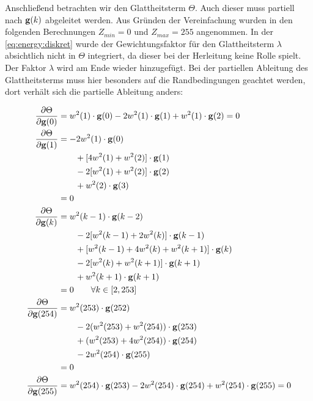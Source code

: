 Anschließend betrachten wir den Glattheitsterm $\Theta$. Auch dieser muss partiell nach $\mathbf g(k)$ abgeleitet werden. Aus Gründen der Vereinfachung wurden in den folgenden Berechnungen $Z_{min} = 0$ und $Z_{max} = 255$ angenommen. In der \autoref{eq:energy:diskret} wurde der Gewichtungsfaktor für den Glattheitsterm $\lambda$ absichtlich nicht in $\Theta$ integriert, da dieser bei der Herleitung keine Rolle spielt. Der Faktor $\lambda$ wird am Ende wieder hinzugefügt. Bei der partiellen Ableitung des Glattheitsterms muss hier besonders auf die Randbedingungen geachtet werden, dort verhält sich die partielle Ableitung anders:

\begin{align}
\label{eq:partials:smoothness:0}
\frac{\partial \Theta}{\partial \mathbf g(0)} &= w^2(1)\cdot \mathbf g(0) -2w^2(1)\cdot \mathbf g(1) + w^2(1)\cdot \mathbf g(2) = 0\\
\label{eq:partials:smoothness:1}
\frac{\partial \Theta}{\partial \mathbf g(1)} &= -2w^2(1)\cdot \mathbf g(0) \nonumber \\
        &\qquad+[4w^2(1)+w^2(2)]\cdot \mathbf g(1) \nonumber \\
        &\qquad- 2 [w^2(1)+w^2(2)]\cdot \mathbf g(2) \nonumber \\
        &\qquad+ w^2(2)\cdot \mathbf g(3) \nonumber \\
        &= 0\\
\label{eq:partials:smoothness:k}
\frac{\partial \Theta}{\partial \mathbf g(k)} &= 
        w^2(k-1)\cdot \mathbf g(k-2)\nonumber\\
        &\qquad- 2[w^2(k-1)+2w^2(k)]\cdot \mathbf g(k-1) \nonumber\\
        &\qquad+ [w^2(k-1)+4w^2(k)+w^2(k+1)]\cdot \mathbf g(k)\nonumber\\ 
        &\qquad- 2[w^2(k)+w^2(k+1)] \cdot \mathbf g(k+1) \nonumber\\
        &\qquad+ w^2(k+1)\cdot \mathbf g(k+1) \nonumber\\
        &=0 \qquad \forall k \in [2,253]\\
\label{eq:partials:smoothness:254}
\frac{\partial \Theta}{\partial \mathbf g(254)} &= w^2(253)\cdot \mathbf g(252) \nonumber \\
        &\qquad -2 (w^2(253)+w^2(254))\cdot \mathbf g(253) \nonumber \\
        &\qquad +(w^2(253)+4 w^2(254)) \cdot \mathbf g(254)\nonumber \\
        &\qquad -2 w^2(254)\cdot \mathbf g(255)\nonumber \\ 
        &= 0\\
\label{eq:partials:smoothness:255}
\frac{\partial \Theta}{\partial \mathbf g(255)} &= 
    w^2(254)\cdot \mathbf g(253) 
    - 2 w^2(254)\cdot \mathbf g(254) 
    + w^2(254)\cdot \mathbf g(255)= 0
\end{align}


